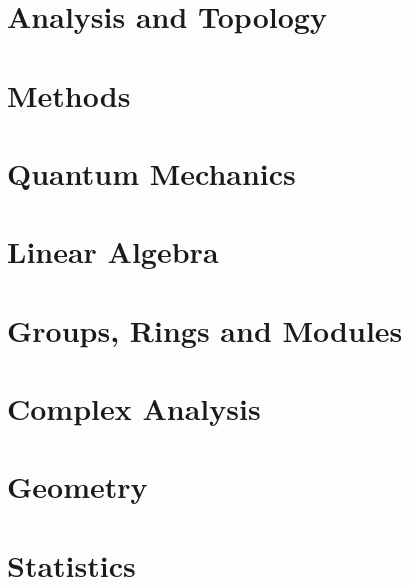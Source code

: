 \documentclass{book}
\begin{document}
\chapter{Analysis and Topology}

\chapter{Methods}

\chapter{Quantum Mechanics}

\chapter{Linear Algebra}

\chapter{Groups, Rings and Modules}

\chapter{Complex Analysis}

\chapter{Geometry}

\chapter{Statistics}

\end{document}
